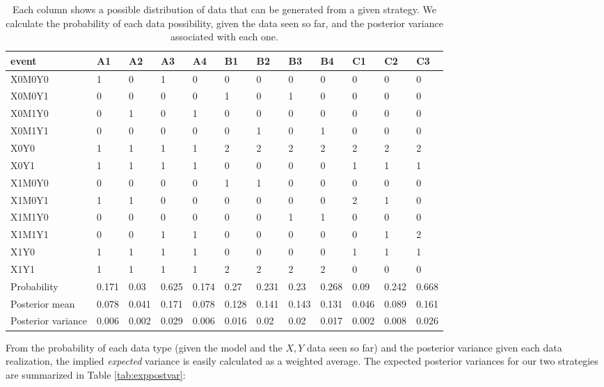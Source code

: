 \documentclass[
  12pt,
]{book}
\begin{document}
\begin{table}

\caption{\label{tab:chselillustration}Each column shows a possible distribution of data that can be generated from a given strategy. We calculate the probability of each data possibility, given the data seen so far, and the posterior variance associated with each one.}
\centering
\begin{tabular}[t]{l|l|l|l|l|l|l|l|l|l|l|l}
\hline
event & A1 & A2 & A3 & A4 & B1 & B2 & B3 & B4 & C1 & C2 & C3\\
\hline
X0M0Y0 & 1 & 0 & 1 & 0 & 0 & 0 & 0 & 0 & 0 & 0 & 0\\
\hline
X0M0Y1 & 0 & 0 & 0 & 0 & 1 & 0 & 1 & 0 & 0 & 0 & 0\\
\hline
X0M1Y0 & 0 & 1 & 0 & 1 & 0 & 0 & 0 & 0 & 0 & 0 & 0\\
\hline
X0M1Y1 & 0 & 0 & 0 & 0 & 0 & 1 & 0 & 1 & 0 & 0 & 0\\
\hline
X0Y0 & 1 & 1 & 1 & 1 & 2 & 2 & 2 & 2 & 2 & 2 & 2\\
\hline
X0Y1 & 1 & 1 & 1 & 1 & 0 & 0 & 0 & 0 & 1 & 1 & 1\\
\hline
X1M0Y0 & 0 & 0 & 0 & 0 & 1 & 1 & 0 & 0 & 0 & 0 & 0\\
\hline
X1M0Y1 & 1 & 1 & 0 & 0 & 0 & 0 & 0 & 0 & 2 & 1 & 0\\
\hline
X1M1Y0 & 0 & 0 & 0 & 0 & 0 & 0 & 1 & 1 & 0 & 0 & 0\\
\hline
X1M1Y1 & 0 & 0 & 1 & 1 & 0 & 0 & 0 & 0 & 0 & 1 & 2\\
\hline
X1Y0 & 1 & 1 & 1 & 1 & 0 & 0 & 0 & 0 & 1 & 1 & 1\\
\hline
X1Y1 & 1 & 1 & 1 & 1 & 2 & 2 & 2 & 2 & 0 & 0 & 0\\
\hline
Probability & 0.171 & 0.03 & 0.625 & 0.174 & 0.27 & 0.231 & 0.23 & 0.268 & 0.09 & 0.242 & 0.668\\
\hline
Posterior mean & 0.078 & 0.041 & 0.171 & 0.078 & 0.128 & 0.141 & 0.143 & 0.131 & 0.046 & 0.089 & 0.161\\
\hline
Posterior variance & 0.006 & 0.002 & 0.029 & 0.006 & 0.016 & 0.02 & 0.02 & 0.017 & 0.002 & 0.008 & 0.026\\
\hline
\end{tabular}
\end{table}

From the probability of each data type (given the model and the \(X,Y\) data seen so far) and the posterior variance given each data realization, the implied \emph{expected} variance is easily calculated as a weighted average. The expected posterior variances for our two strategies are summarized in Table \ref{tab:exppostvar}:
\end{document}
